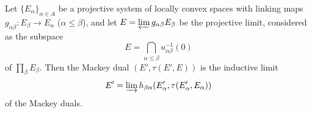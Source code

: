 Let $\{E_\alpha\}_{\alpha \in A}$ be a projective system of locally convex spaces with linking maps $g_{\alpha\beta}: E_\beta \to E_\alpha$ ($\alpha \leq \beta$), and let $E = \varprojlim g_{\alpha\beta} E_\beta$ be the projective limit, considered as the subspace
$$E = \bigcap_{\alpha \leq \beta} u_{\alpha\beta}^{-1}(0)$$
of $\prod_\beta E_\beta$. Then the Mackey dual $(E', \tau(E', E))$ is the inductive limit
$$E' = \varinjlim h_{\beta\alpha} (E'_\alpha, \tau(E'_\alpha, E_\alpha))$$
of the Mackey duals.
